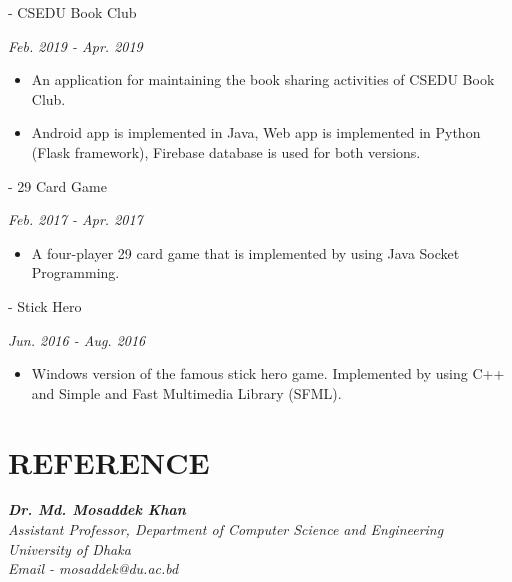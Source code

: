 \documentclass[margin, 10pt]{res} %
\begin{document}
\begin{resume}
- {CSEDU Book Club}
{\sl \hfill {\normalfont Feb. 2019 - Apr. 2019} 
\begin{itemize}
    \item An application for maintaining the book sharing activities of CSEDU Book Club.
    \item Android app is implemented in Java, Web app is implemented in Python (Flask framework), Firebase database is used for both versions.
\end{itemize}
}

- {29 Card Game}
{\sl \hfill {\normalfont Feb. 2017 - Apr. 2017} 
\begin{itemize}
    \item A four-player 29 card game that is implemented by using Java Socket Programming.
\end{itemize}
}

- {Stick Hero}
{\sl \hfill {\normalfont Jun. 2016 - Aug. 2016} 
\begin{itemize}
    \item Windows version of the famous stick hero game. Implemented by using C++ and Simple and Fast Multimedia Library (SFML).
\end{itemize}
}


\section{REFERENCE}

{\sl {\bf Dr. Md. Mosaddek Khan } \\ Assistant Professor, Department of Computer Science and Engineering \\ University of Dhaka
\\ Email - mosaddek@du.ac.bd}


\end{resume}
\end{document}
